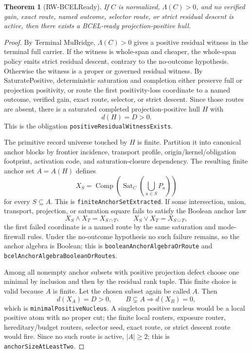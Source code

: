 \documentclass[10.5pt,a4paper]{article}
\newtheorem{theorem}{Theorem}[section]
\newcommand{\Sat}{\operatorname{Sat}}
\newcommand{\Comp}{\operatorname{Comp}}
\begin{document}
\begin{theorem}[RW-BCELReady]
If \(C\) is normalized, \(\Lambda(C)>0\), and no verified gain, exact route, named outcome, selector route, or strict residual descent is active, then there exists a BCEL-ready projection-positive hull.
\end{theorem}

\begin{proof}
By Terminal MuBridge, \(\Lambda(C)>0\) gives a positive residual witness in the terminal full carrier.  If the witness is whole-span and cheaper, the whole-span policy emits strict residual descent, contrary to the no-outcome hypothesis.  Otherwise the witness is a proper or governed residual witness.  By SaturatePositive, deterministic saturation and completion either preserve full or projection positivity, or route the first positivity-loss coordinate to a named outcome, verified gain, exact route, selector, or strict descent.  Since those routes are absent, there is a saturated completed projection-positive hull \(H\) with
\[
 d(H)=D>0.
\]
This is the obligation \texttt{positiveResidualWitnessExists}.

The primitive record universe touched by \(H\) is finite.  Partition it into canonical anchor blocks by frontier incidence, transport profile, origin/kernel/obligation footprint, activation code, and saturation-closure dependency.  The resulting finite anchor set \(A=A(H)\) defines
\[
 X_S=\Comp(\Sat_C(\bigcup_{a\in S}P_a))
\]
for every \(S\subseteq A\).  This is \texttt{finiteAnchorSetExtracted}.  If some intersection, union, transport, projection, or saturation square fails to satisfy the Boolean anchor law
\[
 X_S\wedge X_T=X_{S\cap T},\qquad X_S\vee X_T=X_{S\cup T},
\]
the first failed coordinate is a named route by the same saturation and mode-firewall rules.  Under the no-outcome hypothesis no such failure remains, so the anchor algebra is Boolean; this is \texttt{booleanAnchorAlgebraOrRoute} and \texttt{bcelAnchorAlgebraBooleanOrRoutes}.

Among all nonempty anchor subsets with positive projection defect choose one minimal by inclusion and then by the residual rank tuple.  This finite choice is valid because \(A\) is finite.  Let the chosen subset again be called \(A\).  Then
\[
 d(X_A)=D>0,
 \qquad
 B\subsetneq A\Rightarrow d(X_B)=0,
\]
which is \texttt{minimalPositiveNucleus}.  A singleton positive nucleus would be a local positive atom with no proper cut; the finite local routers, exposure router, hereditary/budget routers, selector seed, exact route, or strict descent route would fire.  Since no such route is active, \(|A|\ge2\); this is \texttt{anchorSizeAtLeastTwo}.


\end{proof}
\end{document}
